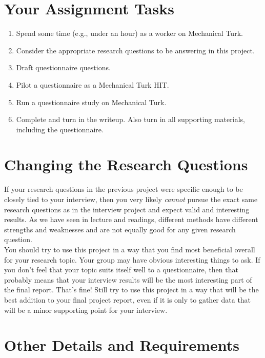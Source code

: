 \documentclass{article}
\begin{document}
\section{Your Assignment Tasks}
\begin{enumerate}
    \item Spend some time (e.g., under an hour) as a worker on Mechanical Turk.
    \item Consider the appropriate research questions to be answering in this project.  
    \item Draft questionnaire questions.
    \item Pilot a questionnaire as a Mechanical Turk HIT.
    \item Run a questionnaire study on Mechanical Turk.
    \item Complete and turn in the writeup. Also turn in all supporting materials, including the questionnaire.
\end{enumerate}

\section{Changing the Research Questions}
If your research questions in the previous project were specific enough to be closely tied to your interview, then you very likely \textit{cannot} pursue the exact same research questions as in the interview project and expect valid and interesting results. As we have seen in lecture and readings, different methods have different strengths and weaknesses and are not equally good for any given research question.\\

You should try to use this project in a way that you find most beneficial overall for your research topic. Your group may have obvious interesting things to ask. If you don't feel that your topic suits itself well to a questionnaire, then that probably means that your interview results will be the most interesting part of the final report. That's fine! Still try to use this project in a way that will be the best addition to your final project report, even if it is only to gather data that will be a minor supporting point for your interview.

\section{Other Details and Requirements}
\end{document}
